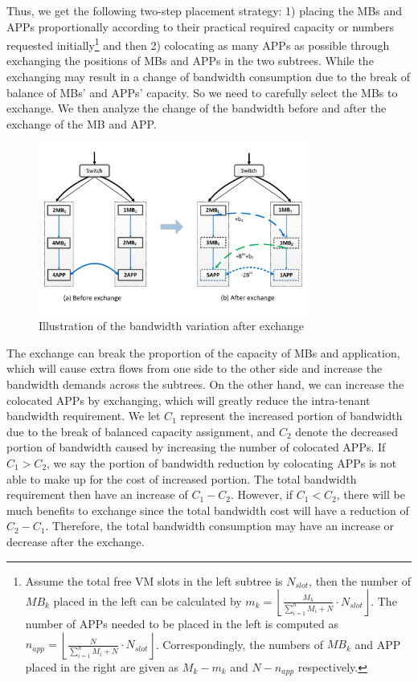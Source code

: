 \documentclass[review]{elsarticle}
\begin{document}
Thus, we get the following two-step placement strategy: 1) placing the MBs and APPs proportionally according to their practical required capacity or numbers requested initially\footnote{Assume the total free VM slots in the left subtree is $N_{slot}$, then the number of $MB_k$ %
placed in the left can be calculated by $m_k=\left\lfloor\frac{M_k}{\sum\nolimits_{i=1}^{n}M_i+N}\cdot N_{slot}\right\rfloor$. The number of APPs needed to be placed in the left is computed as $n_{app}=\left\lfloor\frac{N}{\sum\nolimits_{i=1}^{n}M_i+N}\cdot N_{slot}\right\rfloor$. Correspondingly, the numbers of $MB_k$ and APP placed in the right are given as $M_k-m_k$ and $N-n_{app}$ respectively.}  and then 2) colocating as many APPs as possible through exchanging the positions of MBs and APPs in the two subtrees. While the exchanging may result in a change of bandwidth consumption due to the break of balance of MBs’ and APPs’ capacity. So we need to carefully select the MBs to exchange. We then analyze the change of the bandwidth before and after the exchange of the MB and APP.

\begin{figure}
	\centering
	\includegraphics[width=3.5in]{fig/exchange_example.pdf}
	\caption{Illustration of the bandwidth variation after exchange}
    \label{fig:exchange}
\end{figure}
The exchange can break the proportion of the capacity of MBs and application, which will cause extra flows from one side to the other side and increase the bandwidth demands across the subtrees. On the other hand, we can increase the colocated APPs by exchanging, which will greatly reduce the intra-tenant bandwidth requirement. We let $C_1$ represent the increased portion of bandwidth due to the break of balanced capacity assignment, and $C_2$ denote the decreased portion of bandwidth caused by increasing the number of colocated APPs. If $C_1>C_2$, we say the portion of bandwidth reduction by colocating APPs is not able to make up for the cost of increased portion. The total bandwidth requirement then have an increase of $C_1-C_2$. However, if $C_1<C_2$, there will be much benefits to exchange since the total bandwidth cost will have a reduction of $C_2-C_1$. Therefore, the total bandwidth consumption may have an increase or decrease after the exchange.
\end{document}
